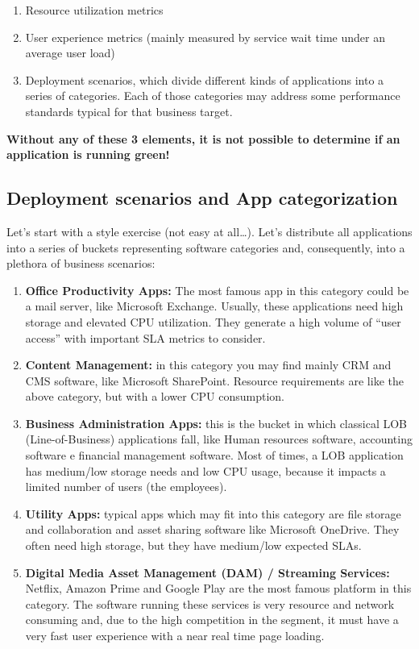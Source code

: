 \documentclass{article}
\begin{document}
\begin{enumerate}
    \item Resource utilization metrics
    \item User experience metrics (mainly measured by service wait time under an average user load)
    \item Deployment scenarios, which divide different kinds of applications into a series of categories. Each of those categories may address some performance standards typical for that business target.
\end{enumerate}

\textbf{Without any of these 3 elements, it is not possible to determine if an application is running green!}

\subsection*{Deployment scenarios and App categorization}

Let’s start with a style exercise (not easy at all…). Let’s distribute all applications into a series of buckets representing software categories and, consequently, into a plethora of business scenarios:

\begin{enumerate}
    \item \textbf{Office Productivity Apps:} The most famous app in this category could be a mail server, like Microsoft Exchange. Usually, these applications need high storage and elevated CPU utilization. They generate a high volume of “user access” with important SLA metrics to consider.
    \item \textbf{Content Management:} in this category you may find mainly CRM and CMS software, like Microsoft SharePoint. Resource requirements are like the above category, but with a lower CPU consumption.
    \item \textbf{Business Administration Apps:} this is the bucket in which classical LOB (Line-of-Business) applications fall, like Human resources software, accounting software e financial management software. Most of times, a LOB application has medium/low storage needs and low CPU usage, because it impacts a limited number of users (the employees).
    \item \textbf{Utility Apps:} typical apps which may fit into this category are file storage and collaboration and asset sharing software like Microsoft OneDrive. They often need high storage, but they have medium/low expected SLAs.
    \item \textbf{Digital Media Asset Management (DAM) / Streaming Services:} Netflix, Amazon Prime and Google Play are the most famous platform in this category. The software running these services is very resource and network consuming and, due to the high competition in the segment, it must have a very fast user experience with a near real time page loading.
\end{enumerate}
\end{document}
